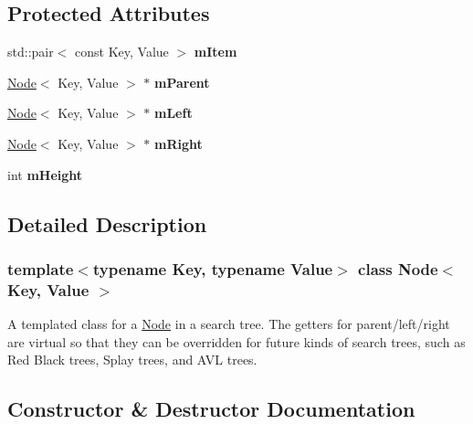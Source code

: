 \subsection*{Protected Attributes}
\begin{DoxyCompactItemize}
\item 
\mbox{\label{classNode_a7d5cce0902ef996ebf45451db8b667fb}} 
std\+::pair$<$ const Key, Value $>$ {\bfseries m\+Item}
\item 
\mbox{\label{classNode_a0edda9f5ea45078bef125a1298de9bef}} 
\mbox{\hyperlink{classNode}{Node}}$<$ Key, Value $>$ $\ast$ {\bfseries m\+Parent}
\item 
\mbox{\label{classNode_a93b44cfd9f890e4ac24b84bb4c06b68d}} 
\mbox{\hyperlink{classNode}{Node}}$<$ Key, Value $>$ $\ast$ {\bfseries m\+Left}
\item 
\mbox{\label{classNode_a3698d0c83982838834bc2218b15d7013}} 
\mbox{\hyperlink{classNode}{Node}}$<$ Key, Value $>$ $\ast$ {\bfseries m\+Right}
\item 
\mbox{\label{classNode_a2ca4a790470adabeff9e94becee1e000}} 
int {\bfseries m\+Height}
\end{DoxyCompactItemize}


\subsection{Detailed Description}
\subsubsection*{template$<$typename Key, typename Value$>$\newline
class Node$<$ Key, Value $>$}

A templated class for a \mbox{\hyperlink{classNode}{Node}} in a search tree. The getters for parent/left/right are virtual so that they can be overridden for future kinds of search trees, such as Red Black trees, Splay trees, and A\+VL trees. 

\subsection{Constructor \& Destructor Documentation}
\mbox{\label{classNode_ac9bdc0036be15ac4b622696c804c501f}} 
